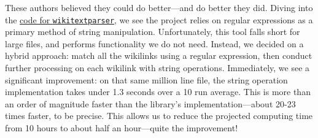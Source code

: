 \documentclass[fontsize=12pt]{article}
\newcommand{\py}[1]{\texttt{#1}}
\begin{document}
\begin{multicols}{2}
    These authors believed they could do better---and do better they did. Diving into the \href{https://github.com/5j9/wikitextparser/blob/master/wikitextparser/_wikilink.py}{code for \py{wikitextparser}}, we see the project relies on regular expressions as a primary method of string manipulation. Unfortunately, this tool falls short for large files, and performs functionality we do not need. Instead, we decided on a hybrid approach: match all the wikilinks using a regular expression, then conduct further processing on each wikilink with string operations. Immediately, we see a significant improvement: on that same million line file, the string operation implementation takes under 1.3 seconds over a 10 run average. This is more than an order of magnitude faster than the library's implementation---about 20-23 times faster, to be precise. This allows us to reduce the projected computing time from 10 hours to about half an hour---quite the improvement!
\end{multicols}
\end{document}
